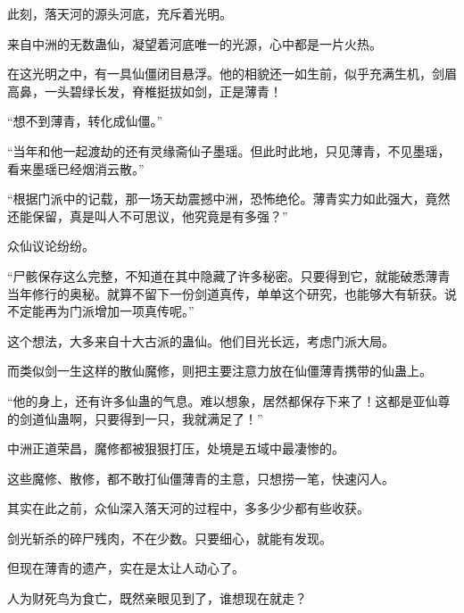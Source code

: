 \begin{this_body}
此刻，落天河的源头河底，充斥着光明。

来自中洲的无数蛊仙，凝望着河底唯一的光源，心中都是一片火热。

在这光明之中，有一具仙僵闭目悬浮。他的相貌还一如生前，似乎充满生机，剑眉高鼻，一头碧绿长发，脊椎挺拔如剑，正是薄青！

“想不到薄青，转化成仙僵。”

“当年和他一起渡劫的还有灵缘斋仙子墨瑶。但此时此地，只见薄青，不见墨瑶，看来墨瑶已经烟消云散。”

“根据门派中的记载，那一场天劫震撼中洲，恐怖绝伦。薄青实力如此强大，竟然还能保留，真是叫人不可思议，他究竟是有多强？”

众仙议论纷纷。

“尸骸保存这么完整，不知道在其中隐藏了许多秘密。只要得到它，就能破悉薄青当年修行的奥秘。就算不留下一份剑道真传，单单这个研究，也能够大有斩获。说不定能再为门派增加一项真传呢。”

这个想法，大多来自十大古派的蛊仙。他们目光长远，考虑门派大局。

而类似剑一生这样的散仙魔修，则把主要注意力放在仙僵薄青携带的仙蛊上。

“他的身上，还有许多仙蛊的气息。难以想象，居然都保存下来了！这都是亚仙尊的剑道仙蛊啊，只要得到一只，我就满足了！”

中洲正道荣昌，魔修都被狠狠打压，处境是五域中最凄惨的。

这些魔修、散修，都不敢打仙僵薄青的主意，只想捞一笔，快速闪人。

其实在此之前，众仙深入落天河的过程中，多多少少都有些收获。

剑光斩杀的碎尸残肉，不在少数。只要细心，就能有发现。

但现在薄青的遗产，实在是太让人动心了。

人为财死鸟为食亡，既然亲眼见到了，谁想现在就走？

\end{this_body}

